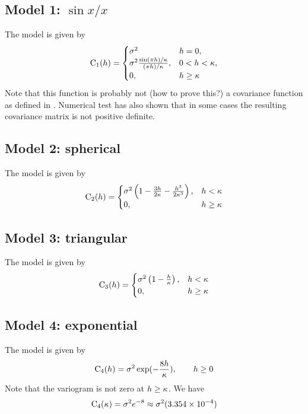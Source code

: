 \documentclass[11pt,a4paper]{amsart}
\begin{document}
\subsection{Model 1: $\sin x/x$}
The model is given by
\begin{align}
  \label{eq:2}
  \operatorname{C}_1(h) =
  \begin{cases}
    \sigma^2 & h = 0,\\
    \sigma^2\frac{\sin (\pi h )/ \kappa}{(\pi h)/\kappa}, & 0 < h < \kappa,\\
    0, & h \geq \kappa
  \end{cases}
\end{align}
Note that this function is probably not (how to prove this?) a covariance function
as defined in \cite{chi12:geo}. Numerical test has also shown that in some cases
the resulting covariance matrix is not positive definite.

\subsection{Model 2:  spherical}
The model is given by \cite{chi12:geo}
\begin{align}
  \label{eq:11}
  \operatorname{C}_2(h) =
  \begin{cases}
    \sigma^2 \left(1 - \frac{3h}{2\kappa} - \frac{h^3}{2\kappa^3}\right), &h<\kappa\\
    0, & h\geq\kappa
  \end{cases}
\end{align}
\subsection{Model 3: triangular}
The model is given by 
\begin{align}
  \label{eq:12}
  \operatorname{C}_3(h) =
  \begin{cases}
    \sigma^2 \left(1 - \frac{h}{\kappa}\right), &h<\kappa\\
    0, & h\geq\kappa
  \end{cases}
\end{align}
\subsection{Model 4: exponential}
The model is given by 
\begin{align}
  \label{eq:13}
  \operatorname{C}_4(h) =
    \sigma^2 \exp(-\frac{8h}{\kappa}), \qquad h\geq 0
\end{align}
Note that the variogram is not zero at $h \geq \kappa$. We have
\begin{align}
  \label{eq:16}
  \operatorname{C}_4(\kappa) = \sigma^2 e^{-8}\approx \sigma^2 (3.354 \times 10^{-4})
\end{align}
\end{document}

